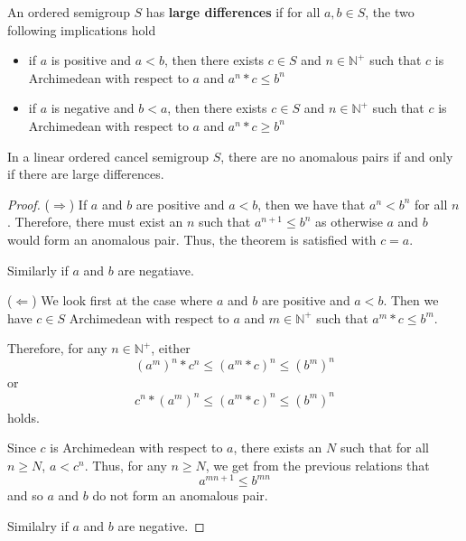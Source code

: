 \begin{definition}\label{def:has_large_differences}\leanok
An ordered semigroup $S$ has \textbf{large differences} if
for all $a,b\in S$, the two following implications hold
\begin{itemize}
\item if $a$ is positive and $a<b$, then there exists $c\in S$
and $n\in \mathbb{N}^+$ such that $c$ is Archimedean with respect to $a$
and $a^n*c \le b^n$
\item if $a$ is negative and $b < a$, then there exists $c\in S$
and $n\in \mathbb{N}^+$ such that $c$ is Archimedean with respect to $a$
and $a^n*c \ge b^n$
\end{itemize}
\end{definition}

\begin{theorem}\leanok
{}
In a linear ordered cancel semigroup $S$, there are no anomalous pairs
if and only if there are large differences.
\end{theorem}
\begin{proof}
($\Rightarrow$)
If $a$ and $b$ are positive and $a < b$, then we have that $a^n < b^n$ for all $n$.
Therefore, there must exist an $n$ such that $a^{n+1} \le b^n$
as otherwise $a$ and $b$ would form an anomalous pair.
Thus, the theorem is satisfied with $c = a$.

Similarly if $a$ and $b$ are negatiave.

($\Leftarrow$)
We look first at the case where $a$ and $b$ are positive and $a < b$.
Then we have $c\in S$ Archimedean with respect to $a$ and $m\in \mathbb{N}^+$ such that
$a^m * c \le b^m$.

Therefore, for any $n \in \mathbb{N}^+$,
either
\[(a^m)^n * c^n \le (a^m*c)^n \le (b^m)^n\]
or
\[c^n * (a^m)^n \le (a^m*c)^n \le (b^m)^n\]
holds.

Since $c$ is Archimedean with respect to $a$, there exists an $N$
such that for all $n \ge N$, $a < c^n$. Thus, for any $n \ge N$,
we get from the previous relations that
\[a^{mn + 1} \le b^{mn}\]
and so $a$ and $b$ do not form an anomalous pair.

Similalry if $a$ and $b$ are negative.
\end{proof}